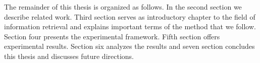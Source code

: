 The remainder of this thesis is organized as follows. In the second section we describe related work. Third section serves as introductory chapter to the field of information retrieval and explains important terms of the method that we follow. Section four presents the experimental framework. Fifth section offers experimental results. Section six analyzes the results and seven section concludes this thesis and discusses future directions.




